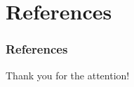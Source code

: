 





\section*{References}
\begin{frame}%
  \frametitle{References}
  
  
\end{frame}

\begin{frame}
  \centering
  {\Huge Thank you for the attention!}
\end{frame}


